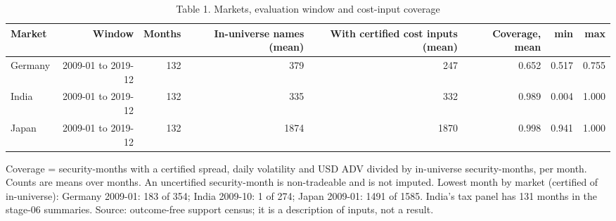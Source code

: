 \begin{table}[t]
\centering
\small
\caption{Table 1. Markets, evaluation window and cost-input coverage}
\label{tab:markets}
\begin{tabular}{lrrrrrrr}
\toprule
Market & Window & Months & In-universe names (mean) & With certified cost inputs (mean) & Coverage, mean & min & max \\
\midrule
Germany & 2009-01 to 2019-12 & 132 & 379 & 247 & 0.652 & 0.517 & 0.755 \\
India & 2009-01 to 2019-12 & 132 & 335 & 332 & 0.989 & 0.004 & 1.000 \\
Japan & 2009-01 to 2019-12 & 132 & 1874 & 1870 & 0.998 & 0.941 & 1.000 \\
\bottomrule
\end{tabular}
\par\vspace{2pt}
\parbox{\textwidth}{\footnotesize Coverage = security-months with a certified spread, daily volatility and USD ADV divided by in-universe security-months, per month. Counts are means over months. An uncertified security-month is non-tradeable and is not imputed. Lowest month by market (certified of in-universe): Germany 2009-01: 183 of 354; India 2009-10: 1 of 274; Japan 2009-01: 1491 of 1585. India's tax panel has 131 months in the stage-06 summaries. Source: outcome-free support census; it is a description of inputs, not a result.}
\end{table}
